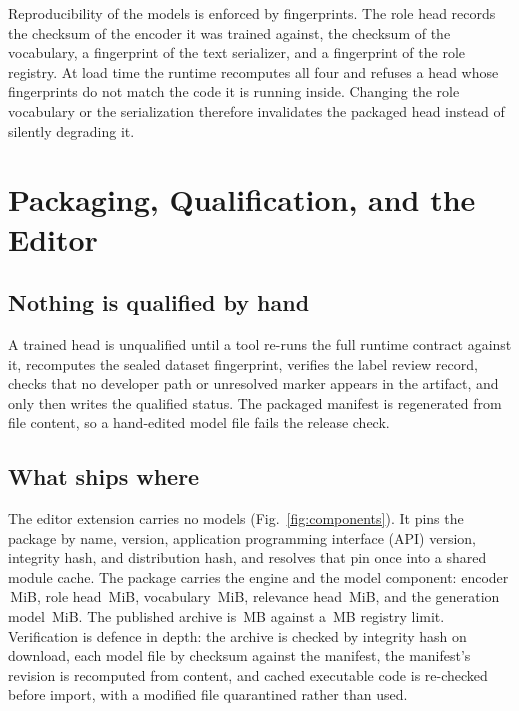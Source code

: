 \documentclass[journal]{IEEEtran}
\begin{document}
Reproducibility of the models is enforced by fingerprints. The role head
records the checksum of the encoder it was trained against, the checksum
of the vocabulary, a fingerprint of the text serializer, and a
fingerprint of the role registry. At load time the runtime recomputes
all four and refuses a head whose fingerprints do not match the code it
is running inside. Changing the role vocabulary or the serialization
therefore invalidates the packaged head instead of silently degrading
it.

\section{Packaging, Qualification, and the Editor}
\label{sec:release}

\subsection{Nothing is qualified by hand}

A trained head is unqualified until a tool re-runs the full runtime
contract against it, recomputes the sealed dataset fingerprint, verifies
the label review record, checks that no developer path or unresolved
marker appears in the artifact, and only then writes the qualified
status. The packaged manifest is regenerated from file content, so a
hand-edited model file fails the release check.

\subsection{What ships where}

The editor extension carries no models (Fig.~\ref{fig:components}). It
pins the package by name, version, application programming interface
(API) version, integrity hash, and distribution hash, and resolves that
pin once into a shared module cache. The package carries the engine and
the model component: encoder \EncoderMiB{}\,MiB, role head
\RoleHeadMiB{}\,MiB, vocabulary \VocabularyMiB{}\,MiB, relevance head
\RelevanceHeadMiB{}\,MiB, and the generation model
\GeneratorModelMiB{}\,MiB. The published archive is \PackageMB{}\,MB
against a \PackageLimitMB{}\,MB registry limit. Verification is defence
in depth: the archive is checked by integrity hash on download, each
model file by checksum against the manifest, the manifest's revision is
recomputed from content, and cached executable code is re-checked before
import, with a modified file quarantined rather than used.
\end{document}
